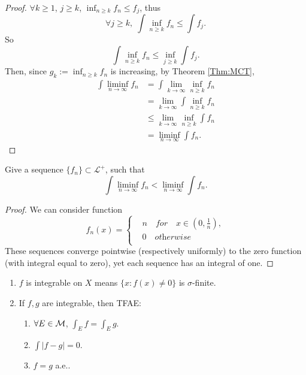 \begin{proof}
    $\forall k\ge 1$, $j\ge k$, $\inf_{n\ge k}f_n\le f_{j}$, 
    thus 
    \begin{displaymath}
        \forall j\ge k,\;
        \int\inf_{n\ge k}f_n\le\int f_{j}.
    \end{displaymath} 
    So 
    \begin{displaymath}
        \int\inf_{n\ge k}f_n\le\inf_{j\ge k}\int f_{j}.
    \end{displaymath}
    Then, since $g_{k}:=\inf_{n\ge k}f_{n}$ is increasing, 
    by Theorem \ref{Thm:MCT}, 
    \begin{displaymath}
        \begin{array}{rl}
        \int\liminf_{n\rightarrow\infty}f_{n}
        &=\int\lim_{k\rightarrow\infty}\inf_{n\ge k}f_{n}\\
        &=\lim_{k\rightarrow\infty}\int\inf_{n\ge k}f_{n}\\
        &\le\lim_{k\rightarrow\infty}\inf_{n\ge k}\int f_{n}\\
        &=\liminf_{n\rightarrow\infty}\int f_{n}.
        \end{array}
    \end{displaymath}
\end{proof}
\begin{exc}
    Give a sequence $\{f_{n}\}\subset\mathcal{L}^{+}$, 
    such that 
    \begin{displaymath}
        \int\liminf_{n\rightarrow\infty}f_{n}<
        \liminf_{n\rightarrow\infty}\int f_{n}.
    \end{displaymath}
\end{exc}
\begin{proof}
    We can consider function
    \begin{displaymath}
        f_n(x)=
        \left\{\begin{array}{rl}
            &n \quad \textit{for} \quad x\in(0,\frac{1}{n}),\\
            &0 \quad \textit{otherwise}\\
        \end{array}
        \right.
    \end{displaymath}
    These sequences converge pointwise (respectively uniformly) 
    to the zero function (with integral equal to zero), 
    yet each sequence has an integral of one.
\end{proof}
\begin{prop}
    \label{Prop:PropOfL1}
    \begin{enumerate}
        \item $f$ is integrable on $X$ 
        means $\{x:f(x)\neq 0\}$ is $\sigma$-finite. 
        \item If $f,g$ are integrable, then TFAE:
        \begin{enumerate}
            \item $\forall E\in\mathcal{M}$, $\int_{E}f=\int_{E}g$.
            \item $\int|f-g|=0$.
            \item $f=g$ a.e..
        \end{enumerate}
    \end{enumerate}
\end{prop}
